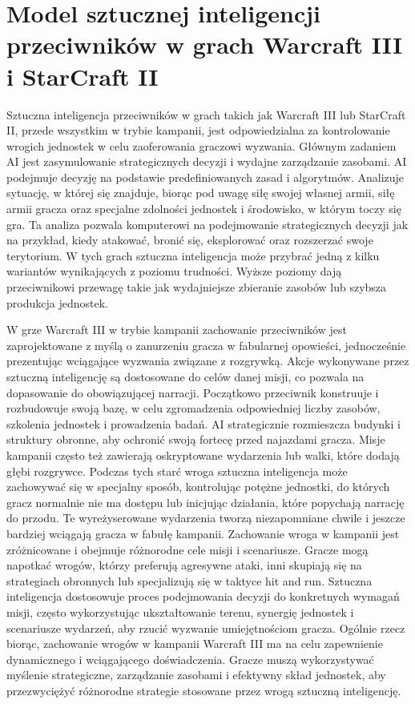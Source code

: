 \section{Model sztucznej inteligencji przeciwników w grach Warcraft III i StarCraft II}
Sztuczna inteligencja przeciwników w grach takich jak Warcraft III lub StarCraft II, przede wszystkim w trybie kampanii,
jest odpowiedzialna za kontrolowanie wrogich jednostek w celu zaoferowania graczowi wyzwania. Głównym zadaniem AI jest zasymulowanie
strategicznych decyzji i wydajne zarządzanie zasobami.
AI podejmuje decyzję na podstawie predefiniowanych zasad i algorytmów. Analizuje sytuację, w której się znajduje, biorąc pod uwagę
siłę swojej własnej armii, siłę armii gracza oraz specjalne zdolności jednostek i środowisko, w którym toczy się gra.
Ta analiza pozwala komputerowi na podejmowanie strategicznych decyzji jak na przykład, kiedy atakować, bronić się, eksplorować oraz rozszerzać swoje terytorium.
W tych grach sztuczna inteligencja może przybrać jedną z kilku wariantów wynikających z poziomu trudności. Wyższe poziomy
dają przeciwnikowi przewagę takie jak wydajniejsze zbieranie zasobów lub szybsza produkcja jednostek.

W grze Warcraft III w trybie kampanii zachowanie przeciwników jest zaprojektowane z myślą o zanurzeniu gracza w fabularnej opowieści, jednocześnie
prezentując wciągające wyzwania związane z rozgrywką. Akcje wykonywane przez sztuczną inteligencję są dostosowane do celów danej misji, co pozwala
na dopasowanie do obowiązującej narracji.
Początkowo przeciwnik konstruuje i rozbudowuje swoją bazę, w celu zgromadzenia odpowiedniej liczby zasobów, szkolenia jednostek i prowadzenia badań.
AI strategicznie rozmieszcza budynki i struktury obronne, aby ochronić swoją fortecę przed najazdami gracza. 
Misje kampanii często też zawierają oskryptowane wydarzenia lub walki, które dodają głębi rozgrywce. Podczas tych starć wroga sztuczna inteligencja
może zachowywać się w specjalny sposób, kontrolując potężne jednostki, do których gracz normalnie nie ma dostępu lub inicjując działania, które popychają
narrację do przodu. Te wyreżyserowane wydarzenia tworzą niezapomniane chwile i jeszcze bardziej wciągają gracza w fabułę kampanii.
Zachowanie wroga w kampanii jest zróżnicowane i obejmuje różnorodne cele misji i scenariusze. Gracze mogą napotkać wrogów, którzy preferują agresywne ataki,
inni skupiają się na strategiach obronnych lub specjalizują się w taktyce hit and run. Sztuczna inteligencja dostosowuje proces podejmowania decyzji do
konkretnych wymagań misji, często wykorzystując ukształtowanie terenu, synergię jednostek i scenariusze wydarzeń, aby rzucić wyzwanie umiejętnościom gracza.
Ogólnie rzecz biorąc, zachowanie wrogów w kampanii Warcraft III ma na celu zapewnienie dynamicznego i wciągającego doświadczenia. Gracze muszą 
wykorzystywać myślenie strategiczne, zarządzanie zasobami i efektywny skład jednostek, aby przezwyciężyć różnorodne strategie stosowane przez wrogą sztuczną inteligencję.
